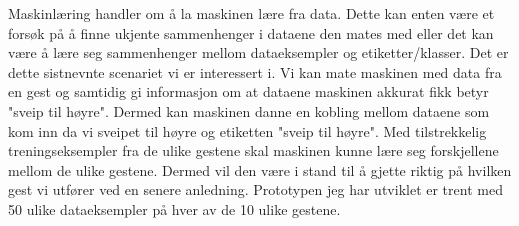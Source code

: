 Maskinlæring handler om å la maskinen lære fra data. Dette kan enten være et forsøk på å finne ukjente sammenhenger i dataene den mates med eller det kan være å lære seg sammenhenger mellom dataeksempler og etiketter/klasser. Det er dette sistnevnte scenariet vi er interessert i. Vi kan mate maskinen med data fra en gest og samtidig gi informasjon om at dataene maskinen akkurat fikk betyr "sveip til høyre". Dermed kan maskinen danne en kobling mellom dataene som kom inn da vi sveipet til høyre og etiketten "sveip til høyre". Med tilstrekkelig treningseksempler fra de ulike gestene skal maskinen kunne lære seg forskjellene mellom de ulike gestene. Dermed vil den være i stand til å gjette riktig på hvilken gest vi utfører ved en senere anledning. Prototypen jeg har utviklet er trent med 50 ulike dataeksempler på hver av de 10 ulike gestene.



